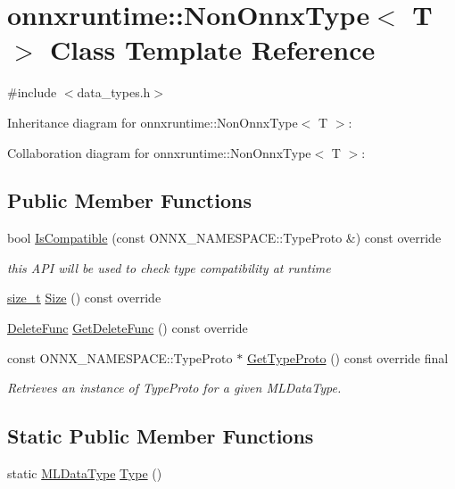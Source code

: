 \hypertarget{classonnxruntime_1_1NonOnnxType}{}\section{onnxruntime\+:\+:Non\+Onnx\+Type$<$ T $>$ Class Template Reference}
\label{classonnxruntime_1_1NonOnnxType}


{\ttfamily \#include $<$data\+\_\+types.\+h$>$}



Inheritance diagram for onnxruntime\+:\+:Non\+Onnx\+Type$<$ T $>$\+:


Collaboration diagram for onnxruntime\+:\+:Non\+Onnx\+Type$<$ T $>$\+:
\subsection*{Public Member Functions}
\begin{DoxyCompactItemize}
\item 
bool \mbox{\hyperlink{classonnxruntime_1_1NonOnnxType_a85fcf77182e033f38fe91c8845bb5aec}{Is\+Compatible}} (const O\+N\+N\+X\+\_\+\+N\+A\+M\+E\+S\+P\+A\+C\+E\+::\+Type\+Proto \&) const override
\begin{DoxyCompactList}\small\item\em this A\+PI will be used to check type compatibility at runtime \end{DoxyCompactList}\item 
\mbox{\hyperlink{mlasi_8h_a503efbc1c6e50825320ad909366b78ab}{size\+\_\+t}} \mbox{\hyperlink{classonnxruntime_1_1NonOnnxType_a563b71919e9400bb66cee0702d98b232}{Size}} () const override
\item 
\mbox{\hyperlink{namespaceonnxruntime_a8dcea0e1aa8476e3d09d5a44a0ca4516}{Delete\+Func}} \mbox{\hyperlink{classonnxruntime_1_1NonOnnxType_a98dc87744e3754168fc7fa333401b873}{Get\+Delete\+Func}} () const override
\item 
const O\+N\+N\+X\+\_\+\+N\+A\+M\+E\+S\+P\+A\+C\+E\+::\+Type\+Proto $\ast$ \mbox{\hyperlink{classonnxruntime_1_1NonOnnxType_af0dfad01d0ab54a20a68a7cf56a6367f}{Get\+Type\+Proto}} () const override final
\begin{DoxyCompactList}\small\item\em Retrieves an instance of Type\+Proto for a given M\+L\+Data\+Type. \end{DoxyCompactList}\end{DoxyCompactItemize}
\subsection*{Static Public Member Functions}
\begin{DoxyCompactItemize}
\item 
static \mbox{\hyperlink{namespaceonnxruntime_ad77d0a6e838ec7da5dc35fed5ee66b49}{M\+L\+Data\+Type}} \mbox{\hyperlink{classonnxruntime_1_1NonOnnxType_a40acd1095f90b416f96b54b619bc55c1}{Type}} ()
\end{DoxyCompactItemize}


